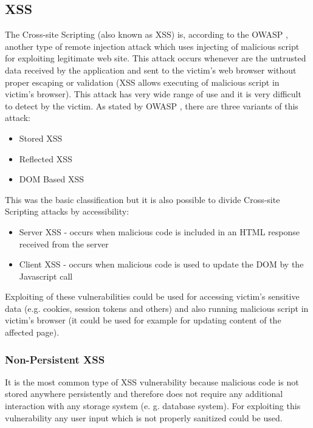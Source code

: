 		\subsection{XSS}\label{xss}
		
		The Cross-site Scripting (also known as XSS) is, according to the OWASP \cite{XSS}, another type of remote injection attack which uses injecting of malicious script for exploiting legitimate web site. This attack occurs whenever are the untrusted data received by the application and sent to the victim's web browser without proper escaping or validation (XSS allows executing of malicious script in victim's browser). This attack has very wide range of use and it is very difficult to detect by the victim. As stated by OWASP \cite{XSS-types}, there are three variants of this attack:
		
		\begin{itemize}
			\item Stored XSS 
			\item Reflected XSS
			\item DOM Based XSS
		\end{itemize}
		
		This was the basic classification but it is also possible to divide Cross-site Scripting attacks by accessibility:
		
		\begin{itemize}
			\item Server XSS - occurs when malicious code is included in an HTML response received from the server
			\item Client XSS - occurs when malicious code is used to update the DOM by the Javascript call
		\end{itemize}
		
		Exploiting of these vulnerabilities could be used for accessing victim's sensitive data (e.g. cookies, session tokens and others) and also running malicious script in victim's browser (it could be used for example for updating content of the affected page).
		
			\subsubsection{Non-Persistent XSS}
			It is the most common type of XSS vulnerability because malicious code is not stored anywhere persistently and therefore does not require any additional interaction with any storage system (e. g. database system). For exploiting this vulnerability any user input which is not properly sanitized could be used.
		
